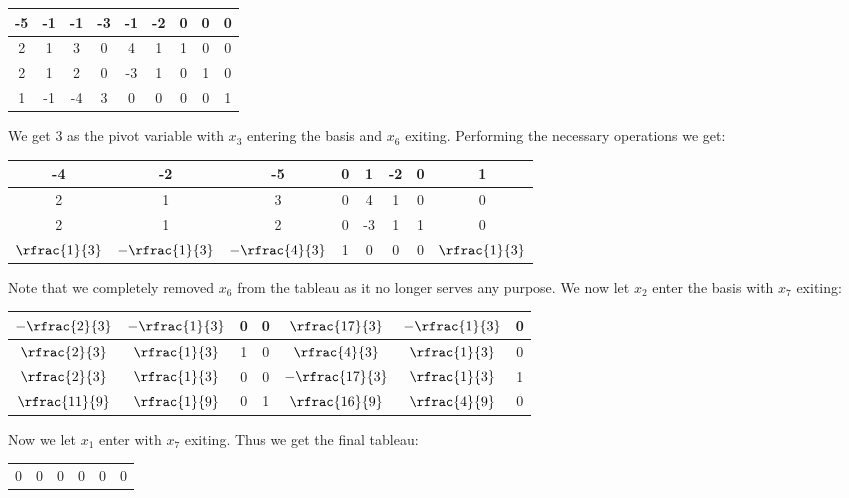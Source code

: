 \documentclass{article}
\begin{document}
\begin{jacklist}
    \begin{center}
        \begin{tabular}{|c|cccccccc|}
            \hline
            -5&-1&-1&-3&-1&-2&0&0&0\\
            \hline
            2&1&3&0&4&1&1&0&0\\
            2&1&2&0&-3&1&0&1&0\\
            1&-1&-4&3&0&0&0&0&1\\
            \hline
        \end{tabular}
    \end{center}
    We get 3 as the pivot variable with $x_3$ entering the basis and $x_6$ exiting. Performing the necessary operations we get:
    \begin{center}
        \begin{tabular}{|c|ccccccc|}
            \hline
            -4&-2&-5&0&1&-2&0&1\\
            \hline
            2&1&3&0&4&1&0&0\\
            2&1&2&0&-3&1&1&0\\
            $\rfrac{1}{3}$&$-\rfrac{1}{3}$&$-\rfrac{4}{3}$&1&0&0&0&$\rfrac{1}{3}$ \\
            \hline
        \end{tabular}
    \end{center}
    Note that we completely removed $x_6$ from the tableau as it no longer serves any purpose. We now let $x_2$ enter the basis with
    $x_7$ exiting: 
    \begin{center}
        \begin{tabular}{|c|cccccc|}
            \hline
            $-\rfrac{2}{3}$&$-\rfrac{1}{3}$&0&0&$\rfrac{17}{3}$&$-\rfrac{1}{3}$&0\\
            \hline
            $\rfrac{2}{3}$&$\rfrac{1}{3}$&1&0&$\rfrac{4}{3}$&$\rfrac{1}{3}$&0\\
            $\rfrac{2}{3}$&$\rfrac{1}{3}$&0&0&$-\rfrac{17}{3}$&$\rfrac{1}{3}$&1\\
            $\rfrac{11}{9}$&$\rfrac{1}{9}$&0&1&$\rfrac{16}{9}$&$\rfrac{4}{9}$&0\\
            \hline
        \end{tabular}
    \end{center}
    Now we let $x_1$ enter with $x_7$ exiting. Thus we get the final tableau: 
    \begin{center}
        \begin{tabular}{|c|ccccc|}
            \hline
            0&0&0&0&0&0\\

\end{tabular}
\end{center}
\end{jacklist}
\end{document}
